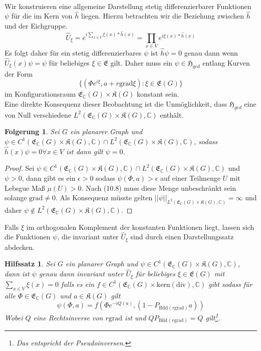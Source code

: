 \documentclass[11pt,a4paper,leqno]{report}
\newtheorem{lemma}[theorem]{Hilfssatz}
\newtheorem{corollary}[theorem]{Folgerung}
\numberwithin{equation}{chapter}
\begin{document}
\\
Wir konstruieren eine allgemeine Darstellung stetig differenzierbarer Funktionen $\psi$ f\"ur die im Kern von $\hat{h}$ liegen. Hierzu betrachten wir die Beziehung zwischen $\hat{h}$ und der Eichgruppe.
\begin{equation}
	\hat{U}_\xi = e^{i\sum_{x\in V}\xi(x)*\hat{h}(x)} = \prod_{x\in V}e^{i\xi(x)*\hat{h}(x)}
\end{equation}
Es folgt daher f\"ur ein stetig differenzierbares $\psi$ ist $\hat{h}\psi=0$ genau dann wenn $\hat{U}_\xi(x)\psi = \psi$ f\"ur beliebiges $\xi\in\mathfrak{E}$ gilt. Daher muss ein $\psi\in \mathfrak{H}_{qed}$ entlang Kurven der Form
\begin{equation}
	\{(\Phi e^{i\xi}, a + r \text{grad}\xi): \xi\in\mathfrak{E}(G)\}
\end{equation} 
im Konfigurationsraum $\mathfrak{E}_\mathbb{C}(G)\times\mathfrak{K}(G)$ konstant sein.\\
Eine direkte Konsequenz dieser Beobachtung ist die Unm\"oglichkeit, dass $\mathfrak{H}_{qed}$ eine von Null verschiedene $L^2(\mathfrak{E}_\mathbb{C}(G)\times\mathfrak{K}(G), \mathbb{C})$ enth\"alt.
\begin{corollary}
	Sei $G$ ein planarer Graph und $\psi\in C^1(\mathfrak{E}_\mathbb{C}(G)\times\mathfrak{K}(G), \mathbb{C})\cap L^2(\mathfrak{E}_\mathbb{C}(G)\times\mathfrak{K}(G), \mathbb{C})$, sodass $\hat{h}(x)\psi=0\forall x\in V$ ist dann gilt $\psi = 0$.
\end{corollary}
\begin{proof}
	Sei $\psi\in C^1(\mathfrak{E}_\mathbb{C}(G)\times\mathfrak{K}(G), \mathbb{C})\cap L^2(\mathfrak{E}_\mathbb{C}(G)\times\mathfrak{K}(G), \mathbb{C})$ und $\psi>0$, dann gibt es ein $\epsilon>0$ sodass $\psi(\Phi, a)>\epsilon$ auf einer Teilmenge $U$ mit Lebsgue Ma\ss{} $\mu(U)>0$. Nach (10.8) muss diese Menge unbeschr\"ankt sein solange $\text{grad}\neq 0$. Als Konsequenz m\"usste gelten $||\psi||_{L^2(\mathfrak{E}_\mathbb{C}(G)\times\mathfrak{K}(G), \mathbb{C})}=\infty$ und daher $\psi \notin L^2(\mathfrak{E}_\mathbb{C}(G)\times\mathfrak{K}(G), \mathbb{C})$.
\end{proof}
\noindent
Falls $\xi$ im orthogonalen Komplement der konstanten Funktionen liegt, lassen sich die Funktionen $\psi$, die invariant unter $\hat{U}_\xi$ sind durch einen Darstellungssatz abdecken.
\begin{lemma}
	Sei $G$ ein planarer Graph und $\psi\in C^1(\mathfrak{E}_\mathbb{C}(G)\times\mathfrak{K}(G), \mathbb{C})$, dann ist $\psi$ genau dann invariant unter $\hat{U}_\xi$ f\"ur beliebiges $\xi\in\mathfrak{E}(G)$ mit $\sum_{x\in V}\xi(x)=0$ falls es ein $f\in C^1(\mathfrak{E}_\mathbb{C}(G)\times\text{kern}(\text{div}), \mathbb{C})$ gibt sodass f\"ur alle $\Phi\in\mathfrak{E}_\mathbb{C}(G)$ und $a\in\mathfrak{K}(G)$ gilt
	\begin{equation}
		\psi(\Phi, a) = f(\Phi e^{-iQ(a)}, (1-P_{\text{Bild}(r\text{grad})}a))
	\end{equation}
	Wobei $Q$ eine Rechtsinverse von $r\text{grad}$ ist und $QP_{\text{Bild}(r\text{grad})}=Q$ gilt\footnote{Das entspricht der Pseudoinversen.}.
\end{lemma}
\end{document}
